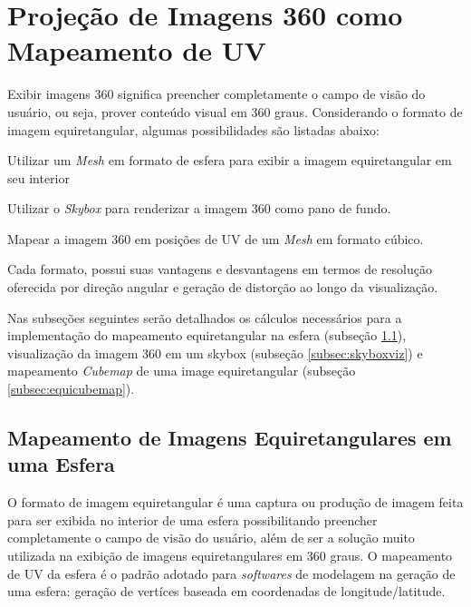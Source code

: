\documentclass[conference]{IEEEtran}
\begin{document}


\section{Projeção de Imagens 360 como Mapeamento de UV}  \label{sec:imageprojection}

Exibir imagens 360 significa preencher completamente o campo de visão do usuário, ou seja, prover conteúdo visual em 360 graus. Considerando o formato de imagem equiretangular, algumas possibilidades são listadas abaixo:

\begin{enumerate}
  \begin{item}Utilizar um \textit{Mesh} em formato de esfera para exibir a imagem equiretangular em seu interior\end{item}
  \begin{item}Utilizar o \textit{Skybox} para renderizar a imagem 360 como pano de fundo.\end{item}
  \begin{item}Mapear a imagem 360 em posições de UV de um \textit{Mesh} em formato cúbico.\end{item}
\end{enumerate}

Cada formato, possui suas vantagens e desvantagens em termos de resolução oferecida por direção angular e geração de distorção ao longo da visualização.

Nas subseções seguintes serão detalhados os cálculos necessários para a implementação do mapeamento equiretangular na esfera (subseção \ref{subsec:equimap}), visualização da imagem 360 em um skybox (subseção \ref{subsec:skyboxviz}) e mapeamento \textit{Cubemap} de uma image equiretangular (subseção \ref{subsec:equicubemap}).


\subsection{Mapeamento de Imagens Equiretangulares em uma Esfera} \label{subsec:equimap}

O formato de imagem equiretangular é uma captura ou produção de imagem feita para ser exibida no interior de uma esfera possibilitando preencher completamente o campo de visão do usuário, além de ser a solução muito utilizada na exibição de imagens equiretangulares em 360 graus. O mapeamento de UV da esfera é o padrão adotado para \textit{softwares} de modelagem na geração de uma esfera: geração de vertíces baseada em coordenadas de longitude/latitude.
\end{document}
